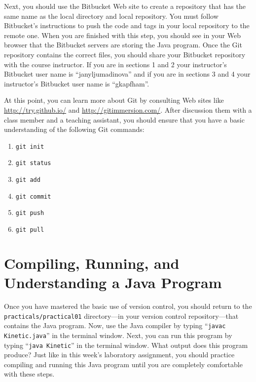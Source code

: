 Next, you should use the Bitbucket Web site to create a repository that has the same name as the local directory and
local repository.  You must follow Bitbucket's instructions to push the code and tags in your local repository to the
remote one. When you are finished with this step, you should see in your Web browser that the Bitbucket servers are
storing the Java program. Once the Git repository contains the correct files, you should share your Bitbucket repository
with the course instructor. If you are in sections 1 and 2 your instructor's Bitbucket user name is ``janyljumadinova'' and if you are in sections 3 and 4 your instructor's Bitbucket user name is ``gkapfham''.

At this point, you can learn more about Git by consulting Web sites like \url{http://try.github.io/} and
\url{http://gitimmersion.com/}.  After discussion them with a class member and a teaching assistant, you should ensure
that you have a basic understanding of the following Git commands:

\vspace*{-.125in}
\begin{enumerate}
  \item {\tt git init}
  \item {\tt git status}
  \item {\tt git add}
  \item {\tt git commit}
  \item {\tt git push}
  \item {\tt git pull}
\end{enumerate}
\vspace*{-.125in}

\section*{Compiling, Running, and Understanding a Java Program}

Once you have mastered the basic use of version control, you should return to the \\ {\tt practicals/practical01}
directory---in your version control repository---that contains the Java program. Now, use the Java compiler by typing
``{\tt javac Kinetic.java}'' in the terminal window.  Next, you can run this program by typing ``{\tt java Kinetic}'' in
the terminal window.  What output does this program produce?  Just like in this week's laboratory assignment, you should
practice compiling and running this Java program until you are completely comfortable with these steps.

